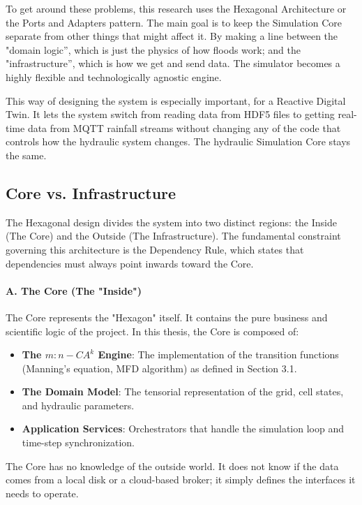 To get around these problems, this research uses the Hexagonal Architecture or the Ports and Adapters pattern. The main goal is to keep 
the Simulation Core separate from other things that might affect it. By making a line between the "domain logic”, which is just the 
physics of how floods work; and the "infrastructure”, which is how we get and send data. The simulator becomes a highly flexible and 
technologically agnostic engine.

This way of designing the system is especially important, for a Reactive Digital Twin. It lets the system switch from reading data from 
HDF5 files to getting real-time data from MQTT rainfall streams without changing any of the code that controls how the hydraulic system 
changes. The hydraulic Simulation Core stays the same.


\subsection{Core vs. Infrastructure}

The Hexagonal design divides the system into two distinct regions: the Inside (The Core) and the Outside (The Infrastructure). The 
fundamental constraint governing this architecture is the Dependency Rule, which states that dependencies must always point inwards 
toward the Core.

\paragraph{A. The Core (The "Inside")}

The Core represents the "Hexagon" itself. It contains the pure business and scientific logic of the project. In this thesis, the Core 
is composed of:

\begin{itemize}
    \item \textbf{The $m:n-CA^k$ Engine}: The implementation of the transition functions (Manning’s equation, MFD algorithm) as defined in Section 3.1.

    \item \textbf{The Domain Model}: The tensorial representation of the grid, cell states, and hydraulic parameters.

    \item \textbf{Application Services}: Orchestrators that handle the simulation loop and time-step synchronization.
\end{itemize}

The Core has no knowledge of the outside world. It does not know if the data comes from a local disk or a cloud-based broker; it simply 
defines the interfaces it needs to operate.

